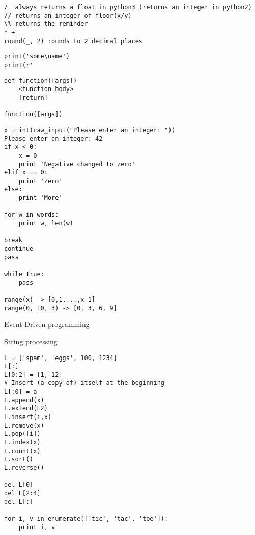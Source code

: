 \documentclass[9pt]{amsart}
\begin{document}
\begin{multicols}{2}
\noindent {\textcolor {blue} {\em Arithmetic operations}} 
\begin{lstlisting}
/  always returns a float in python3 (returns an integer in python2)
// returns an integer of floor(x/y)
\% returns the reminder
* + -
round(_, 2) rounds to 2 decimal places
\end{lstlisting}

\noindent {\textcolor {blue} {\em Strings}} 
\begin{lstlisting}
print('some\name')
print(r'
\end{lstlisting}

\noindent {\textcolor {blue} {\em Variable scopes}} 

\noindent {\textcolor {blue} {\em Functions}}  

\begin{lstlisting}
def	function([args])
	<function body>
	[return]

function([args])
\end{lstlisting}

\noindent {\textcolor {blue} {\em Logic and Control}}  

\begin{lstlisting}
x = int(raw_input("Please enter an integer: "))
Please enter an integer: 42
if x < 0:
	x = 0
	print 'Negative changed to zero'
elif x == 0:
	print 'Zero'
else:
	print 'More'
	
for w in words:
	print w, len(w)
	
break
continue
pass

while True:
	pass
	
range(x) -> [0,1,...,x-1]
range(0, 10, 3) -> [0, 3, 6, 9]

\end{lstlisting}

Event-Driven programming

String processing

\noindent {\textcolor {blue} {\em Lists \& List Menthods}} 

\begin{lstlisting}
L = ['spam', 'eggs', 100, 1234]
L[:]
L[0:2] = [1, 12]
# Insert (a copy of) itself at the beginning
L[:0] = a
L.append(x)
L.extend(L2)
L.insert(i,x)
L.remove(x)
L.pop([i])
L.index(x)
L.count(x)
L.sort()
L.reverse()

del L[0]
del L[2:4]
del L[:]

for i, v in enumerate(['tic', 'tac', 'toe']):
	print i, v
\end{lstlisting}

\noindent {\textcolor {blue} {\em Functional Programming Tools}}


\end{multicols}
\end{document}
